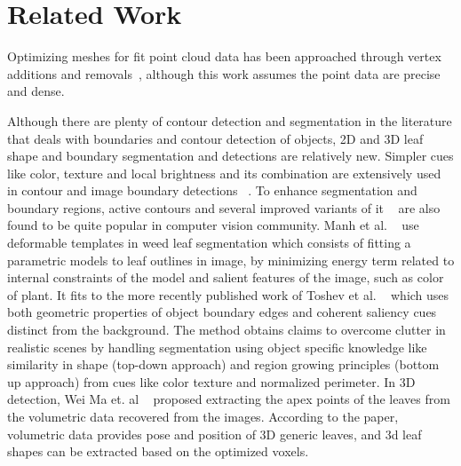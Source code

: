 \section{Related Work}
\label{sec:related}


Optimizing meshes for fit point cloud data has been approached through vertex additions and removals~\cite{hoppe:1994}, although this work assumes the point data are precise and dense.

Although there are plenty of contour detection and segmentation in the literature that deals with boundaries and contour detection of objects, 2D and 3D leaf shape and boundary segmentation and detections are relatively new. Simpler cues like color, texture and local brightness and its combination are extensively used in contour and image boundary detections ~\cite{martin2004learning,valliammal2012leaf}. To enhance segmentation and boundary regions, active contours and several improved variants of it ~\cite{mishra2011decoupled} are also found to be quite popular in computer vision community. Manh et al. ~\cite{Manh2001139} use deformable templates in weed leaf segmentation which consists of fitting a parametric models to leaf outlines in image, by minimizing energy term related to internal constraints of the model and salient features of the image, such as color of plant. It fits to the more recently published work of Toshev et al. ~\cite{toshev2012shape} which uses both geometric properties of object boundary edges and coherent saliency cues distinct from the background. The method obtains claims to overcome clutter in realistic scenes by handling segmentation using object specific knowledge like similarity in shape (top-down approach) and region growing principles (bottom up approach) from cues like color texture and normalized perimeter. In 3D detection, Wei Ma et. al ~\cite{ma2008image} proposed extracting the apex points of the leaves from the volumetric data recovered from the images. According to the paper, volumetric data provides pose and position of 3D generic leaves, and 3d leaf shapes can be extracted based on the optimized voxels.



